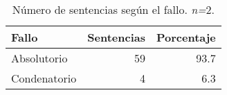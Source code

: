 \begin{table}[H]
\centering
\caption{Número de sentencias según el fallo. \textit{n=}2.} 
\label{tab:fallo}
\begin{tabular}{lrr}
  \hline
Fallo & Sentencias & Porcentaje \\ 
  \hline
Absolutorio & 59 & 93.7 \\ 
  Condenatorio &  4 & 6.3 \\ 
   \hline
\end{tabular}
\end{table}
